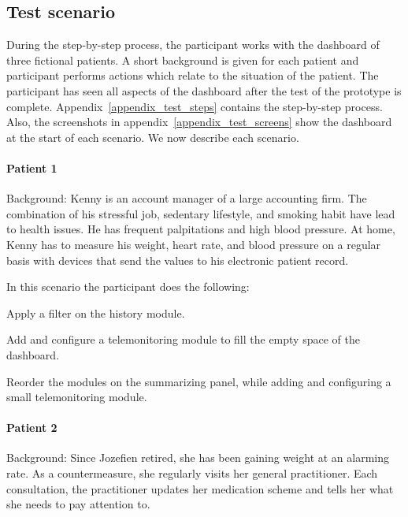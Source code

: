     \subsection{Test scenario}

    During the step-by-step process, the participant works with the dashboard of three fictional patients. A short background is given for each patient and participant performs actions which relate to the situation of the patient. The participant has seen all aspects of the dashboard after the test of the prototype is complete. Appendix~\ref{appendix_test_steps} contains the step-by-step process. Also, the screenshots in appendix~\ref{appendix_test_screens} show the dashboard at the start of each scenario. We now describe each scenario.

    \paragraph{Patient 1} Background: Kenny is an account manager of a large accounting firm. The combination of his stressful job, sedentary lifestyle, and smoking habit have lead to health issues. He has frequent palpitations and high blood pressure. At home, Kenny has to measure his weight, heart rate, and blood pressure on a regular basis with devices that send the values to his electronic patient record.

    In this scenario the participant does the following:
    \vspace{-6pt}
    \begin{myenumerate}
        \item Apply a filter on the history module.
        \item Add and configure a telemonitoring module to fill the empty space of the dashboard.
        \item Reorder the modules on the summarizing panel, while adding and configuring a small telemonitoring module.
    \end{myenumerate}

    \paragraph{Patient 2} Background: Since Jozefien retired, she has been gaining weight at an alarming rate. As a countermeasure, she regularly visits her general practitioner. Each consultation, the practitioner updates her medication scheme and tells her what she needs to pay attention to.

